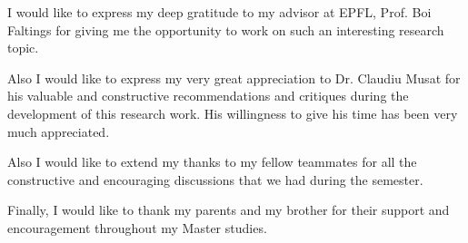 I would like to express my deep gratitude to my advisor at EPFL, Prof. Boi Faltings for giving me the opportunity to work on such an interesting research topic.

Also I would like to express my very great appreciation to Dr. Claudiu Musat for his valuable and constructive recommendations and critiques during the development of this research work.  His willingness to give his time has been very much appreciated.

Also I would like to extend my thanks to my fellow teammates for all the constructive and encouraging discussions that we had during the semester.

Finally, I would like to thank my parents and my brother for their support and encouragement throughout my Master studies. 

\afterpage{\blankpage}
